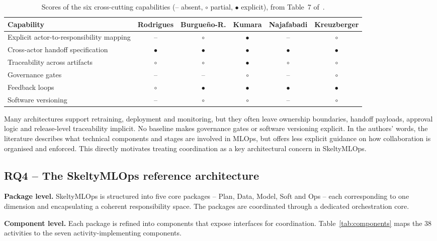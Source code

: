 \documentclass[11pt,a4paper]{article}
\begin{document}
\begin{table}[h]
\centering
\caption{Scores of the six cross-cutting capabilities (-- absent, $\circ$ partial, $\bullet$ explicit), from Table~7 of~\cite{daoud2026}.}\label{tab:capabilities}
\small
\begin{tabular}{@{}lccccc@{}}
\toprule
Capability & Rodrigues & Burgue\~no-R. & Kumara & Najafabadi & Kreuzberger \\
\midrule
Explicit actor-to-responsibility mapping & -- & $\circ$ & $\bullet$ & -- & $\circ$ \\
Cross-actor handoff specification & $\bullet$ & $\bullet$ & $\bullet$ & $\bullet$ & $\bullet$ \\
Traceability across artifacts & $\circ$ & $\circ$ & $\bullet$ & $\circ$ & $\circ$ \\
Governance gates & -- & -- & $\circ$ & -- & $\circ$ \\
Feedback loops & $\circ$ & $\bullet$ & $\bullet$ & $\bullet$ & $\bullet$ \\
Software versioning & -- & $\circ$ & $\circ$ & -- & $\circ$ \\
\bottomrule
\end{tabular}
\end{table}

\begin{callout}
Many architectures support retraining, deployment and monitoring, but they often leave ownership boundaries, handoff payloads, approval logic and release-level traceability implicit. No baseline makes governance gates or software versioning explicit. In the authors' words, the literature describes what technical components and stages are involved in MLOps, but offers less explicit guidance on how collaboration is organised and enforced. This directly motivates treating coordination as a key architectural concern in SkeltyMLOps.
\end{callout}

\subsection{RQ4 -- The SkeltyMLOps reference architecture}

\textbf{Package level.}
SkeltyMLOps is structured into five core packages -- Plan, Data, Model, Soft and Ops -- each corresponding to one dimension and encapsulating a coherent responsibility space. The packages are coordinated through a dedicated orchestration core.

\textbf{Component level.}
Each package is refined into components that expose interfaces for coordination. Table~\ref{tab:components} maps the 38 activities to the seven activity-implementing components.
\end{document}
